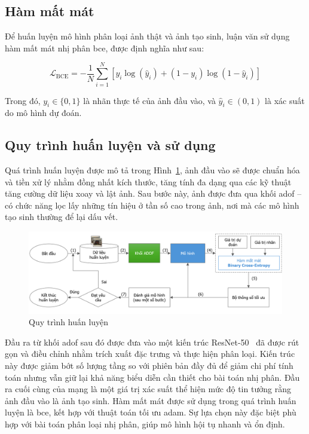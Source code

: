 \subsection{Hàm mất mát}
\label{ss:ham_mat_mat_bce}
Để huấn luyện mô hình phân loại ảnh thật và ảnh tạo sinh, luận văn sử dụng hàm mất mát nhị phân \gls{bce}, được định nghĩa như sau:

\begin{equation}
	\mathcal{L}_{\mathrm{BCE}} = -\frac{1}{N} \sum_{i=1}^{N} \left[ y_i \log(\hat{y}_i) + (1 - y_i)\log(1 - \hat{y}_i) \right]
\end{equation}

Trong đó, \( y_i \in \{0, 1\} \) là nhãn thực tế của ảnh đầu vào, và \( \hat{y}_i \in (0, 1) \) là xác suất do mô hình dự đoán.

\subsection{Quy trình huấn luyện và sử dụng}
%
\label{ssec:quy_trinh_huan_luyen}
%
Quá trình huấn luyện được mô tả trong Hình~\ref{fig:offline-training-process}, ảnh đầu vào sẽ được chuẩn hóa và tiền xử lý nhằm đồng nhất kích thước, tăng tính đa dạng qua các kỹ thuật tăng cường dữ liệu xoay và lật ảnh. Sau bước này, ảnh được đưa qua khối \gls{adof} – có chức năng lọc lấy những tín hiệu ở tần số cao trong ảnh, nơi mà các mô hình tạo sinh thường để lại dấu vết.
%
\begin{figure}[h!]
	\centering
	\includegraphics[width=1.0\linewidth]{Images/offline-training-process.png}
	\begin{minipage}{1.0\linewidth}
		\vspace{3mm}
		\caption{Quy trình huấn luyện}
		\label{fig:offline-training-process}
	\end{minipage}
\end{figure}
%
Đầu ra từ khối \gls{adof} sau đó được đưa vào một kiến trúc ResNet-50~\cite{He2015DeepRL} đã được rút gọn và điều chỉnh nhằm trích xuất đặc trưng và thực hiện phân loại. Kiến trúc này được giảm bớt số lượng tầng so với phiên bản đầy đủ để giảm chi phí tính toán nhưng vẫn giữ lại khả năng biểu diễn cần thiết cho bài toán nhị phân. Đầu ra cuối cùng của mạng là một giá trị xác suất thể hiện mức độ tin tưởng rằng ảnh đầu vào là ảnh tạo sinh. Hàm mất mát được sử dụng trong quá trình huấn luyện là \gls{bce}, kết hợp với thuật toán tối ưu \gls{adam}. Sự lựa chọn này đặc biệt phù hợp với bài toán phân loại nhị phân, giúp mô hình hội tụ nhanh và ổn định. 


